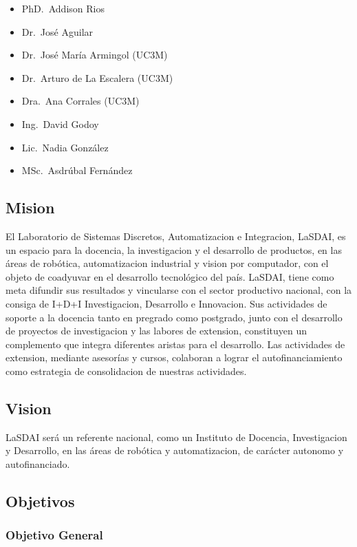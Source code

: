 \begin{itemize}
	\itemsep1pt \parskip0pt 
	\item PhD.\ Addison Rios
	\item Dr.\ José Aguilar
	\item Dr.\ José María Armingol (UC3M)
	\item Dr.\ Arturo de La Escalera (UC3M)
	\item Dra.\ Ana Corrales (UC3M)
	\item Ing.\ David Godoy
	\item Lic.\ Nadia González
	\item MSc.\ Asdrúbal Fernández
\end{itemize}

\subsection{Mision}

El Laboratorio de Sistemas Discretos, Automatizacion e Integracion, LaSDAI, es un espacio para la docencia, la investigacion y el desarrollo de productos, en las áreas de robótica, automatizacion industrial y vision por computador, con el objeto de coadyuvar en el desarrollo tecnológico del país.
LaSDAI, tiene como meta difundir sus resultados  y vincularse con el sector productivo nacional, con la consiga de I+D+I Investigacion, Desarrollo e Innovacion. Sus actividades de soporte a la docencia tanto en pregrado como postgrado, junto con el desarrollo de proyectos de investigacion y las labores de extension, constituyen un complemento que integra diferentes aristas para el desarrollo. Las actividades de extension, mediante asesorías y cursos, colaboran a lograr el autofinanciamiento como estrategia de consolidacion de nuestras actividades.

\subsection{Vision}

LaSDAI será un referente nacional, como un Instituto de Docencia, Investigacion y Desarrollo, en las áreas de robótica y automatizacion, de carácter autonomo y autofinanciado.

\subsection{Objetivos}

\subsubsection{Objetivo General}

